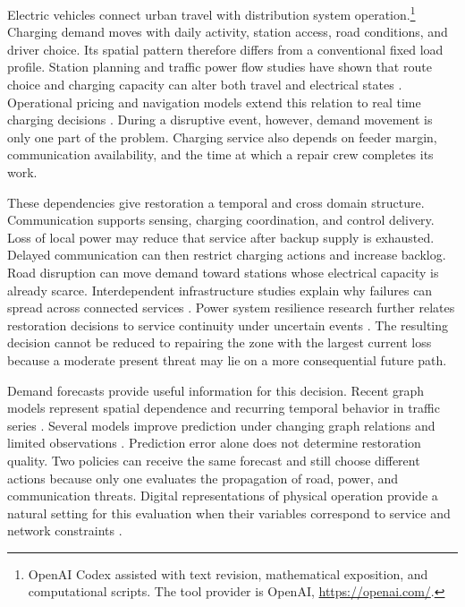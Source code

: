 \documentclass[journal]{IEEEtran}
\begin{document}
Electric vehicles connect urban travel with distribution system operation.\footnote{\label{fn:ai-text}OpenAI Codex assisted with text revision, mathematical exposition, and computational scripts. The tool provider is OpenAI, \url{https://openai.com/}.}
Charging demand moves with daily activity, station access, road conditions, and
driver choice.  Its spatial pattern therefore differs from a conventional
fixed load profile.  Station planning and traffic power flow studies have shown
that route choice and charging capacity can alter both travel and electrical
states \cite{he2015charging,wei2018trafficpower,qian2021fast}.  Operational
pricing and navigation models extend this relation to real time charging
decisions \cite{cui2021pricing,li2024inverse,ran2024fast}.  During a disruptive
event, however, demand movement is only one part of the problem.  Charging
service also depends on feeder margin, communication availability, and the time
at which a repair crew completes its work.

These dependencies give restoration a temporal and cross domain structure.
Communication supports sensing, charging coordination, and control delivery.
Loss of local power may reduce that service after backup supply is exhausted.
Delayed communication can then restrict charging actions and increase backlog.
Road disruption can move demand toward stations whose electrical capacity is
already scarce.  Interdependent infrastructure studies explain why failures
can spread across connected services \cite{rinaldi2001interdependencies,
ouyang2014review}.  Power system resilience research further relates
restoration decisions to service continuity under uncertain events
\cite{panteli2015resilience,ti2022resilience}.  The resulting decision cannot be
reduced to repairing the zone with the largest current loss because a moderate
present threat may lie on a more consequential future path.

Demand forecasts provide useful information for this decision.  Recent graph
models represent spatial dependence and recurring temporal behavior in traffic
series \cite{yin2022deep,jiang2023survey}.  Several
models improve prediction under changing graph relations and limited
observations \cite{jin2023autodstsgn,li2023few,shin2024pgcn}.  Prediction error
alone does not determine restoration quality.  Two policies can receive the
same forecast and still choose different actions because only one evaluates
the propagation of road, power, and communication threats.  Digital
representations of physical operation provide a natural setting for this
evaluation when their variables correspond to service and network constraints
\cite{tao2019digital,fuller2020digital,minerva2020digital}.
\end{document}
